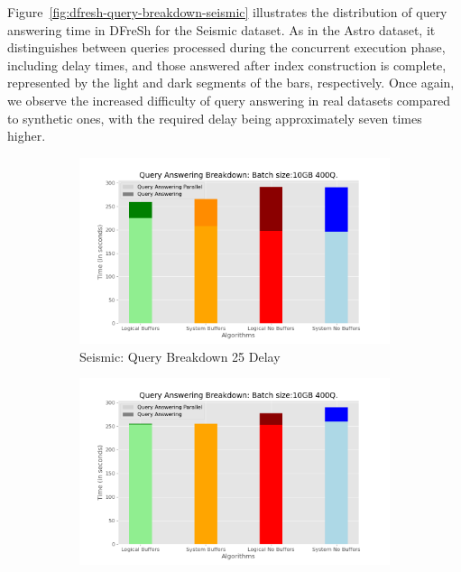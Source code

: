 %
Figure~\ref{fig:dfresh-query-breakdown-seismic} illustrates the distribution of query 
answering time in DFreSh for the Seismic dataset. As in the Astro dataset, it
distinguishes between queries processed during the concurrent execution phase,
including delay times, and those answered after index construction is complete,
represented by the light and dark segments of the bars, respectively. Once again,
we observe the increased difficulty of query answering in real datasets compared to
synthetic ones, with the required delay being approximately seven times higher.

\begin{figure}
	\centering
	\begin{subfigure}[c]{0.48\textwidth}
		\includegraphics[width=1\textwidth]   {figures/Experiments/Dynamic/SEISMIC/25/breakdown_seismic_25.png}
		\caption{Seismic: Query Breakdown 25 Delay}
		\label{fig:actual-query-breakdown-25-seismic}
	\end{subfigure}
	\begin{subfigure}[c]{0.48\textwidth}
		\includegraphics[width=1\textwidth]	 {figures/Experiments/Dynamic/SEISMIC/35/breakdown_seismic_35.png}

\end{subfigure}
\end{figure}
